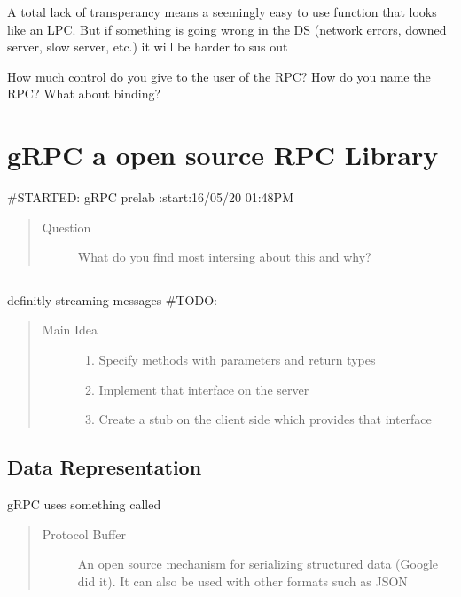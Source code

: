 \documentclass[letterpaper,10pt,english]{sphinxmanual}
\begin{document}
A total lack of transperancy means a seemingly easy to use function that
looks like an LPC. But if something is going wrong in the DS (network errors,
downed server, slow server, etc.) it will be harder to sus out

How much control do you give to the user of the RPC?
How do you name the RPC? What about binding?


\section{gRPC a open source RPC Library}
\label{\detokenize{week2:grpc-a-open-source-rpc-library}}
\#STARTED: gRPC prelab :start:16/05/20 01:48PM
\begin{quote}\begin{description}
\item[{Question}] \leavevmode
What do you find most intersing about this and why?

\end{description}\end{quote}


\bigskip\hrule\bigskip


definitly streaming messages
\#TODO:
\begin{quote}\begin{description}
\item[{Main Idea}] \leavevmode\begin{enumerate}
%
\item {} 
Specify methods with parameters and return types

\item {} 
Implement that interface on the server

\item {} 
Create a stub on the client side which provides
that interface

\end{enumerate}

\end{description}\end{quote}


\subsection{Data Representation}
\label{\detokenize{week2:data-representation}}
gRPC uses something called 
\begin{quote}\begin{description}
\item[{Protocol Buffer}] \leavevmode
An open source mechanism for serializing structured data
(Google did it). It can also be used with other formats
such as JSON

\end{description}\end{quote}
\end{document}
